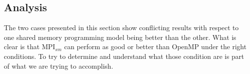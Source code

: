 \begin{comment}
\medskip

Notice that the ratio of time taken by MPI$_{sm}$ to OpenMP, shown in Figure \ref{fig:RatioDunkelCFD_Pin} is close to 1 indicating a similar performance between the MPI$_{sm}$ and the OpenMP versions of the program.
...







\end{comment} 


\subsection*{Analysis}
The two cases presented in this section show conflicting results with respect to one shared memory programming model being better than the other. What is clear is that MPI$_{sm}$ can perform as good or better than OpenMP under the right conditions. To try to determine and understand what those condition are is part of what we are trying to accomplish.


